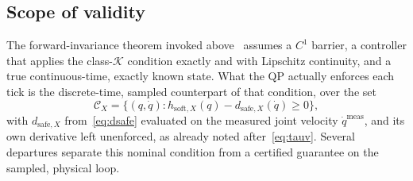 \documentclass[12pt,a4paper,twoside,openright]{report}
\newcommand{\qdot}{\dot{q}}
\begin{document}
\subsection{Scope of validity}
\label{sec:cbf-scope}

The forward-invariance theorem invoked above~\cite{ames2017cbf} assumes a $C^1$ barrier, a controller that applies the class-$\mathcal{K}$ condition exactly and with Lipschitz continuity, and a true continuous-time, exactly known state. What the QP actually enforces each tick is the discrete-time, sampled counterpart of that condition, over the set
\begin{equation}
\mathcal{C}_X = \bigl\{(q,\qdot) : h_{\text{soft},X}(q) - d_{\text{safe},X}(\qdot) \ge 0\bigr\},
\label{eq:cbfscope}
\end{equation}
with $d_{\text{safe},X}$ from~\eqref{eq:dsafe} evaluated on the measured joint velocity $\qdot^{\text{meas}}$, and its own derivative left unenforced, as already noted after~\eqref{eq:tauv}. Several departures separate this nominal condition from a certified guarantee on the sampled, physical loop.
\end{document}
